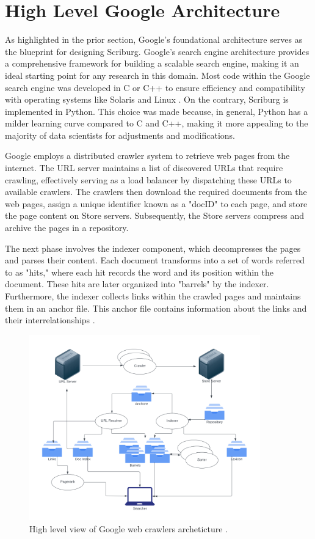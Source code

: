 \section{High Level Google Architecture}\label{sec:high-level-google-architecture}

As highlighted in the prior section, Google's foundational architecture serves as the blueprint for designing Scriburg. Google's search engine architecture provides a comprehensive framework for building a scalable search engine, making it an ideal starting point for any research in this domain. Most code within the Google search engine was developed in C or C++ to ensure efficiency and compatibility with operating systems like Solaris and Linux \cite{brin1998anatomy}. On the contrary, Scriburg is implemented in Python. This choice was made because, in general, Python has a milder learning curve compared to C and C++, making it more appealing to the majority of data scientists for adjustments and modifications.

Google employs a distributed crawler system to retrieve web pages from the internet. The URL server maintains a list of discovered URLs that require crawling, effectively serving as a load balancer by dispatching these URLs to available crawlers. The crawlers then download the required documents from the web pages, assign a unique identifier known as a "docID" to each page, and store the page content on Store servers. Subsequently, the Store servers compress and archive the pages in a repository.

The next phase involves the indexer component, which decompresses the pages and parses their content. Each document transforms into a set of words referred to as "hits," where each hit records the word and its position within the document. These hits are later organized into "barrels" by the indexer. Furthermore, the indexer collects links within the crawled pages and maintains them in an anchor file. This anchor file contains information about the links and their interrelationships \cite{brin1998anatomy}.


\begin{figure}[h]	
     \centering
     \includegraphics[width=10cm]{figures/google_arch.png}
     \caption{High level view of Google web crawlers archeticture \cite{brin1998anatomy}.}
     \label{fig:google-arch}
\end{figure}

